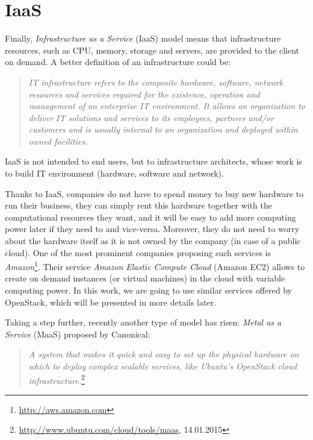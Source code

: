 \section{IaaS}
Finally, \textit{Infrastructure as a Service} (IaaS) model means that infrastructure resources, such as CPU, memory, storage and servers, are provided to the client on demand. A better definition of an infrastructure could be:
\begin{quotation}
\textit{
IT infrastructure refers to the composite hardware, software, network resources and services required for the existence, operation and management of an enterprise IT environment. It allows an organization to deliver IT solutions and services to its employees, partners and/or customers and is usually internal to an organization and deployed within owned facilities.
}\cite{cjanssen14}
\end{quotation}

IaaS is not intended to end users, but to infrastructure architects, whose work is to build IT environment (hardware, software and network).

Thanks to IaaS, companies do not have to spend money to buy new hardware to run their business, they can simply rent this hardware together with the computational resources they want, and it will be easy to add more computing power later if they need to and vice-versa. 
Moreover, they do not need to worry about the hardware itself as it is not owned by the company (in case of a public cloud). 
One of the most prominent companies proposing such services is \textit{Amazon}\footnote{\url{http://aws.amazon.com}}. 
Their service \textit{Amazon Elastic Compute Cloud} (Amazon EC2) allows to create on demand instances (or virtual machines) in the cloud with variable computing power. 
In this work, we are going to use similar services offered by OpenStack, which will be presented in more details later.

Taking a step further, recently another type of model has risen: \textit{Metal as a Service} (MaaS) proposed by Canonical:
\begin{quotation}
\textit{A system that makes it quick and easy to set up the physical hardware on which to deploy complex scalable services, like Ubuntu’s OpenStack cloud infrastructure.}\footnote{\url{http://www.ubuntu.com/cloud/tools/maas}, 14.01.2015}
\end{quotation}

